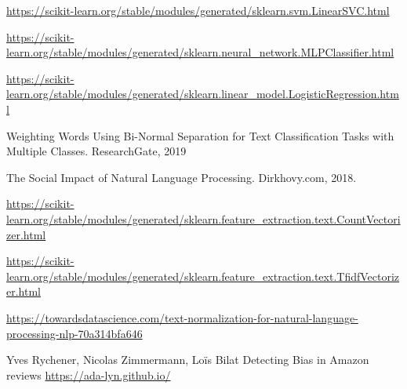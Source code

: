 \documentclass[twoside,twocolumn]{article}
\begin{document}
\begin{thebibliography}{99} %

	\url{https://scikit-learn.org/stable/modules/generated/sklearn.svm.LinearSVC.html}

	\url{https://scikit-learn.org/stable/modules/generated/sklearn.neural_network.MLPClassifier.html}

	\url{https://scikit-learn.org/stable/modules/generated/sklearn.linear_model.LogisticRegression.html}

	\newblock Weighting Words Using Bi-Normal Separation for Text Classification Tasks with Multiple Classes. ResearchGate, 2019

	\newblock The Social Impact of Natural Language Processing. Dirkhovy.com, 2018.

	\url{https://scikit-learn.org/stable/modules/generated/sklearn.feature_extraction.text.CountVectorizer.html}

	\url{https://scikit-learn.org/stable/modules/generated/sklearn.feature_extraction.text.TfidfVectorizer.html}

	\url{https://towardsdatascience.com/text-normalization-for-natural-language-processing-nlp-70a314bfa646}

	Yves Rychener, Nicolas Zimmermann, Loïs Bilat
	\newblock Detecting Bias in Amazon reviews
	\url{https://ada-lyn.github.io/}
\end{thebibliography}

\end{document}
